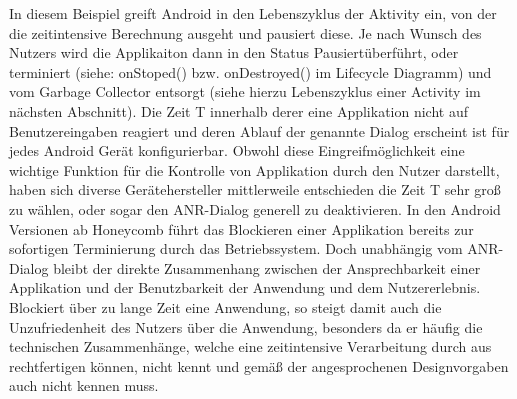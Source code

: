 \documentclass[12pt,oneside,a4paper,bibtotoc,liststotoc]{scrreprt}
\begin{document}
In diesem Beispiel greift Android in den Lebenszyklus der Aktivity ein, von der die zeitintensive Berechnung ausgeht und pausiert diese. Je nach Wunsch des Nutzers wird die Applikaiton dann in den Status \glqq Pausiert\grqq überführt, oder terminiert (siehe: onStoped() bzw. onDestroyed() im Lifecycle Diagramm) und vom Garbage Collector entsorgt (siehe hierzu Lebenszyklus einer Activity im nächsten Abschnitt). Die Zeit T innerhalb derer eine Applikation nicht auf Benutzereingaben reagiert und deren Ablauf der genannte Dialog erscheint ist für jedes Android Gerät konfigurierbar. Obwohl diese Eingreifmöglichkeit eine wichtige Funktion für die Kontrolle von Applikation durch den Nutzer darstellt, haben sich diverse Gerätehersteller mittlerweile entschieden die Zeit T sehr groß zu wählen, oder sogar den ANR-Dialog generell zu deaktivieren. In den Android Versionen ab Honeycomb führt das Blockieren einer Applikation bereits zur sofortigen Terminierung durch das Betriebssystem. Doch unabhängig vom ANR-Dialog bleibt der direkte Zusammenhang zwischen der Ansprechbarkeit einer Applikation und der Benutzbarkeit der Anwendung und dem Nutzererlebnis. Blockiert über zu lange Zeit eine Anwendung, so steigt damit auch die Unzufriedenheit des Nutzers über die Anwendung, besonders da er häufig die technischen Zusammenhänge, welche eine zeitintensive Verarbeitung durch aus rechtfertigen können, nicht kennt und gemäß der angesprochenen Designvorgaben auch nicht kennen muss.
\end{document}
